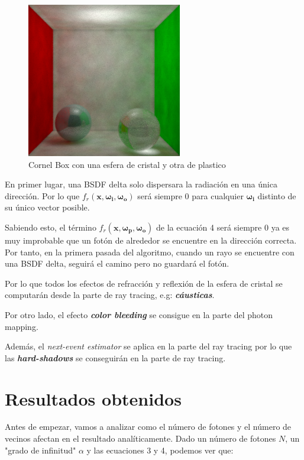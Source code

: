 \documentclass{article}
\begin{document}
\begin{figure}[H]
\centering
\includegraphics[width=0.6\linewidth]{imgs/pm_delta1.png}
\caption{Cornel Box con una esfera de cristal y otra de plastico}
\end{figure}

En primer lugar, una BSDF delta solo dispersara la radiación en una única dirección. Por lo que \(f_r(\mathbf{x}, \mathbf{\omega_{i}}, \mathbf{\omega_{o}})\) será siempre 0 para cualquier \(\mathbf{\omega_{i}}\) distinto de su único vector posible.

Sabiendo esto, el término \( f_r(\mathbf{x}, \mathbf{\omega_{p}}, \mathbf{\omega_{o}}) \) de la ecuación 4 será siempre 0 ya es muy improbable que un fotón de alrededor se encuentre en la dirección correcta. Por tanto, en la primera pasada del algoritmo, cuando un rayo se encuentre con una BSDF delta, seguirá el camino pero no guardará el fotón.

Por lo que todos los efectos de refracción y reflexión de la esfera de cristal
se computarán desde la parte de ray tracing, e.g: \textbf{\textit{cáusticas}}. 

Por otro lado, el efecto \textbf{\textit{color bleeding}} se consigue en la parte del photon mapping.

Además, el \textit{next-event estimator} se aplica en la parte del ray tracing por lo que las \textbf{\textit{hard-shadows}} se conseguirán en la parte de ray tracing.

\section{Resultados obtenidos}

Antes de empezar, vamos a analizar como el número de fotones y el número de vecinos afectan en el resultado analíticamente.
Dado un número de fotones \(N\), un "grado de infinitud" \(\alpha\) y las ecuaciones 3 y 4, podemos ver que:
\end{document}
